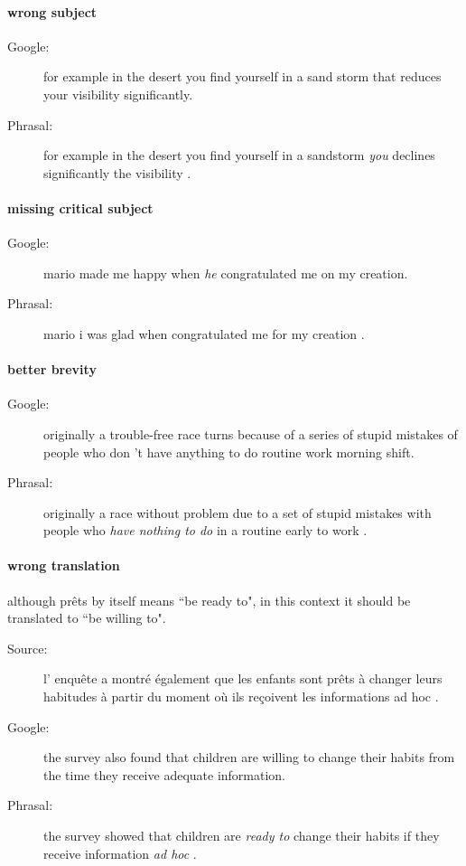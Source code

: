 \documentclass{article}
\begin{document}
\paragraph{wrong subject}
\begin{description}
\item[Google:] for example in the desert you find yourself in a sand storm that reduces your visibility significantly.
\item[Phrasal:] for example in the desert you find yourself in a sandstorm \textit{you} declines significantly the visibility .
\end{description}

\paragraph{missing critical subject}
\begin{description}
\item[Google:] mario made me happy when \textit{he} congratulated me on my creation.
\item[Phrasal:] mario i was glad when congratulated me for my creation .
\end{description}

\paragraph{better brevity}
\begin{description}
\item[Google:] originally a trouble-free race turns because of a series of stupid mistakes of people who don 't have anything to do routine work morning shift.
\item[Phrasal:] originally a race without problem due to a set of stupid mistakes with people who \textit{have nothing to do} in a routine early to work .
\end{description}

\paragraph{wrong translation}
although prêts by itself means ``be ready to", in this context it should be translated to ``be willing to".
\begin{description}
\item[Source:] l' enquête a montré également que les enfants sont prêts à changer leurs habitudes à partir du moment où ils reçoivent les informations ad hoc .
\item[Google:] the survey also found that children are willing to change their habits from the time they receive adequate information.
\item[Phrasal:] the survey showed that children are \textit{ready to} change their habits if they receive information \textit{ad hoc} .
\end{description}
\end{document}
